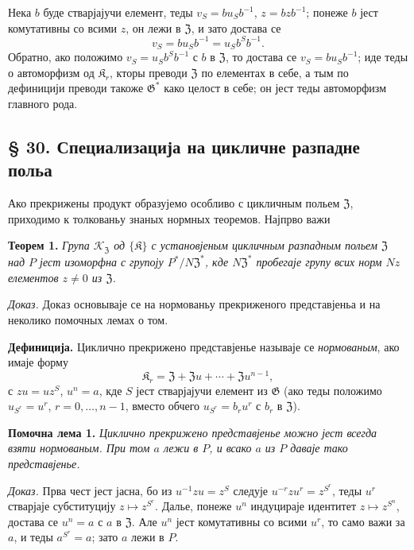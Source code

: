 \documentclass[11pt]{article}
\begin{document}
Нека \(b\) буде стварјајучи елемент, теды \(v_S=bu_Sb^{-1}\), \(z=bzb^{-1}\); понеже \(b\) јест комутативны со всими \(z\), он лежи в \(\mathfrak Z\), и зато достава се
\[
v_S=bu_Sb^{-1}=u_Sb^Sb^{-1}.
\]
Обратно, ако положимо \(v_S=u_Sb^Sb^{-1}\) с \(b\) в \(\mathfrak Z\), то достава се \(v_S=bu_Sb^{-1}\); иде теды о автоморфизм од \(\mathfrak K_r\), кторы преводи \(\mathfrak Z\) по елементах в себе, а тым по дефиницији преводи такоже \(\mathfrak G^*\) како целост в себе; он јест теды автоморфизм главного рода.

\subsection*{§ 30. Специализација на цикличне разпадне польа}\label{spezialisierung-auf-zyklische-zerfaellungskoerper}

Ако прекрижены продукт образујемо особливо с цикличным польем \(\mathfrak Z\), приходимо к толкованьу знаных нормных теоремов. Најпрво важи

\noindent\textbf{Теорем 1.} \emph{Група \(\mathscr K_{\mathfrak Z}\) од \(\{\mathfrak K\}\) с установјеным цикличным разпадным польем \(\mathfrak Z\) над \(P\) јест изоморфна с групоју \(P^*/N\mathfrak Z^*\), кде \(N\mathfrak Z^*\) пробегаје групу всих норм \(Nz\) елементов \(z\neq0\) из \(\mathfrak Z\).}

\noindent\emph{Доказ.} Доказ основываје се на нормованьу прекриженого представјеньа и на неколико помочных лемах о том.

\noindent\textbf{Дефиниција.} Циклично прекрижено представјенье называје се \emph{нормованым}, ако имаје форму
\[
\mathfrak K_r=\mathfrak Z+\mathfrak Zu+\cdots+\mathfrak Zu^{n-1},
\]
с \(zu=uz^S\), \(u^n=a\), кде \(S\) јест стварјајучи елемент из \(\mathfrak G\) (ако теды положимо \(u_{S^r}=u^r\), \(r=0,\ldots,n-1\), вместо обчего \(u_{S^r}=b_ru^r\) с \(b_r\) в \(\mathfrak Z\)).

\noindent\textbf{Помочна лема 1.} \emph{Циклично прекрижено представјенье можно јест всегда взяти нормованым. При том \(a\) лежи в \(P\), и всако \(a\) из \(P\) даваје тако представјенье.}

\noindent\emph{Доказ.} Прва чест јест јасна, бо из \(u^{-1}zu=z^S\) следује \(u^{-r}zu^r=z^{S^r}\), теды \(u^r\) стварјаје субституцију \(z\mapsto z^{S^r}\). Далье, понеже \(u^n\) индуцираје идентитет \(z\mapsto z^{S^n}\), достава се \(u^n=a\) с \(a\) в \(\mathfrak Z\). Але \(u^n\) јест комутативны со всими \(u^r\), то само важи за \(a\), и теды \(a^{S^r}=a\); зато \(a\) лежи в \(P\).
\end{document}
